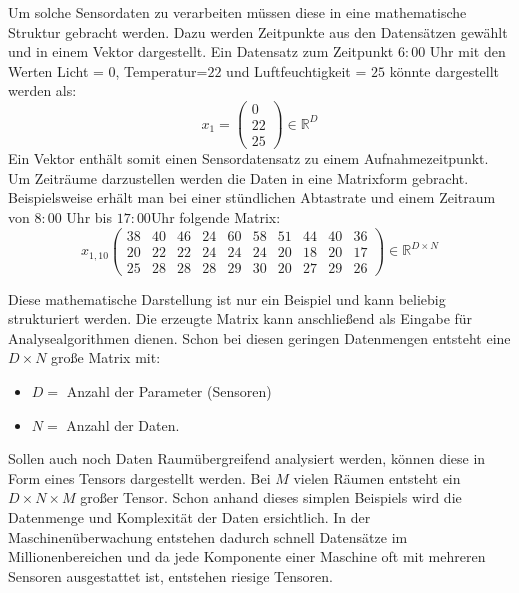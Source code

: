 Um solche Sensordaten zu verarbeiten müssen diese in eine mathematische Struktur gebracht werden. 
Dazu werden Zeitpunkte aus den Datensätzen gewählt und in einem Vektor dargestellt.
Ein Datensatz zum Zeitpunkt $6:00$ Uhr mit den Werten Licht = $0$, Temperatur=$22$ und Luftfeuchtigkeit = $25$ könnte dargestellt werden als:
\begin{equation}
    x_1 =
  \begin{pmatrix}
      0\\
      22\\
      25
  \end{pmatrix}
  \in \mathbb{R}^D
\end{equation}
Ein Vektor enthält somit einen Sensordatensatz zu einem Aufnahmezeitpunkt. Um Zeiträume darzustellen werden die Daten in eine Matrixform gebracht. Beispielsweise erhält man bei einer stündlichen Abtastrate und einem Zeitraum von $8:00$ Uhr bis $17:00$Uhr folgende Matrix:
\begin{equation}
    x_{1,10}
    \begin{pmatrix}
       38 & 40 & 46 & 24 & 60 & 58 & 51 & 44 & 40 & 36\\
       20 & 22 & 22 & 24 & 24 & 24 & 20 & 18 & 20 & 17\\
       25 & 28 & 28 & 28 & 29 & 30 & 20 & 27 & 29 & 26
    \end{pmatrix}
    \in \mathbb{R}^{D \times N}
\end{equation}

Diese mathematische Darstellung ist nur ein Beispiel und kann beliebig strukturiert werden.
Die erzeugte Matrix kann anschließend als Eingabe für Analysealgorithmen dienen.
Schon bei diesen geringen Datenmengen entsteht eine $D \times N $ große Matrix mit: 
\begin{itemize}
  \item $D=$ Anzahl der Parameter (Sensoren)
  \item $N=$ Anzahl der Daten.
\end{itemize}

Sollen auch noch Daten Raumübergreifend analysiert werden, können diese in Form eines Tensors dargestellt werden. Bei $M$ vielen Räumen entsteht ein $D \times N \times M$ großer Tensor.
Schon anhand dieses simplen Beispiels wird die Datenmenge und Komplexität der Daten ersichtlich.
In der Maschinenüberwachung entstehen dadurch schnell Datensätze im Millionenbereichen und da jede Komponente einer Maschine oft mit mehreren Sensoren ausgestattet ist, entstehen riesige Tensoren.

